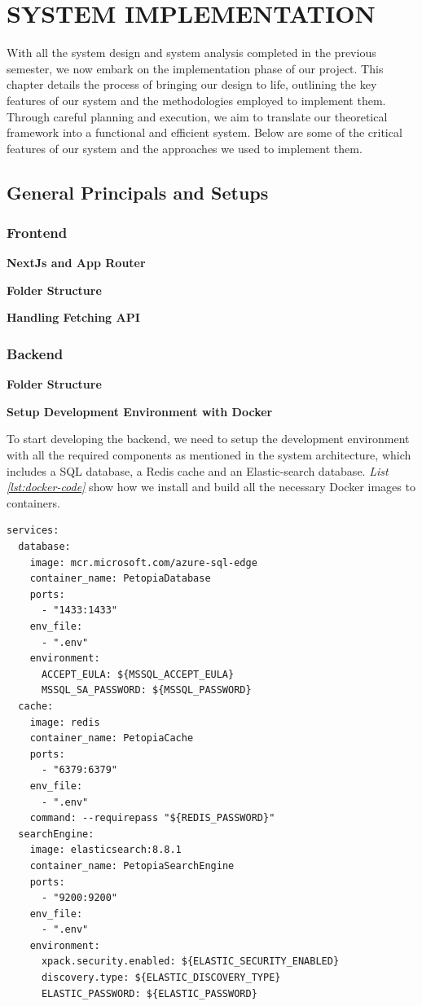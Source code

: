 \chapter{SYSTEM IMPLEMENTATION}
With all the system design and system analysis completed in the previous semester, we now embark on the implementation phase of our project. This chapter details the process of bringing our design to life, outlining the key features of our system and the methodologies employed to implement them. Through careful planning and execution, we aim to translate our theoretical framework into a functional and efficient system. Below are some of the critical features of our system and the approaches we used to implement them.

\section{General Principals and Setups}
\subsection{Frontend}

\textbf{NextJs and App Router}

\textbf{Folder Structure}

\textbf{Handling Fetching API}

\subsection{Backend}

\textbf{Folder Structure}


\textbf{Setup Development Environment with Docker}

To start developing the backend, we need to setup the development environment with
all the required components as mentioned in the system architecture, which includes a SQL database, a Redis cache and an Elastic-search database. 
\textit{List \ref{lst:docker-code}} show how we install and build all the necessary Docker images to containers.

\begin{lstlisting}[caption=Setup Development Environment with Docker, label={lst:docker-code}]
services:
  database:
    image: mcr.microsoft.com/azure-sql-edge
    container_name: PetopiaDatabase
    ports:
      - "1433:1433"
    env_file:
      - ".env"
    environment:
      ACCEPT_EULA: ${MSSQL_ACCEPT_EULA}
      MSSQL_SA_PASSWORD: ${MSSQL_PASSWORD}
  cache:
    image: redis
    container_name: PetopiaCache
    ports:
      - "6379:6379"
    env_file:
      - ".env"
    command: --requirepass "${REDIS_PASSWORD}"
  searchEngine:
    image: elasticsearch:8.8.1
    container_name: PetopiaSearchEngine
    ports:
      - "9200:9200"
    env_file:
      - ".env"
    environment:
      xpack.security.enabled: ${ELASTIC_SECURITY_ENABLED}
      discovery.type: ${ELASTIC_DISCOVERY_TYPE}
      ELASTIC_PASSWORD: ${ELASTIC_PASSWORD}
\end{lstlisting}

